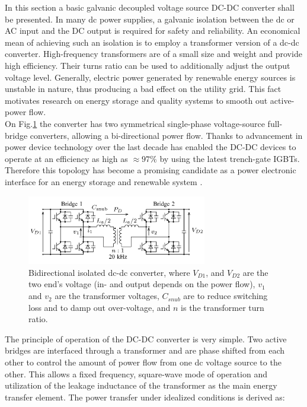 In this section a basic galvanic decoupled voltage source DC-DC converter shall be presented. In many dc power supplies, a galvanic isolation between the dc or AC input and the DC output is required for safety and reliability. An economical mean of achieving such an isolation is to employ a transformer version of a dc-dc converter. High-frequency transformers are of a small size and weight and provide high efficiency. Their turns ratio can be used to additionally adjust the output voltage level. Generally, electric power generated by renewable energy sources is unstable in nature, thus producing a bad effect on the utility grid. This fact motivates research on energy storage and quality systems to smooth out active-power flow.\\
On Fig.\ref{BASICCSR:fig:DCDCGalvanic} the converter has two symmetrical single-phase voltage-source full-bridge converters, allowing a bi-directional power flow. Thanks to advancement in power device technology over the last decade has enabled the DC-DC devices to operate at an efficiency as high as $\approx97\%$ by using the latest trench-gate IGBTs. Therefore this topology has become a promising candidate as a power electronic interface for an energy storage and renewable system \cite{kheraluwala1992performance} \cite{inoue2007bidirectional}.


\begin{figure}[!ht]
        \centering
        \includegraphics[width=0.7\textwidth]{EMPC_PNG_Pics/DC_DC_galvanic.png}
        \caption{Bidirectional isolated dc-dc converter, where $V_{D1}$, and $V_{D2}$ are the two end's voltage (in- and output depends on the power flow), $v_1$ and $v_2$ are the transformer voltages, $C_{snub}$ are to reduce switching loss and to damp out
over-voltage, and $n$ is the transformer turn ratio.}
        \label{BASICCSR:fig:DCDCGalvanic}
    \end{figure}
		
The principle of operation of the DC-DC converter is very simple. Two active bridges are interfaced through a transformer and are phase shifted from each other to control the amount of power flow from one dc voltage source to the other. This allows a fixed frequency, square-wave mode of operation and utilization of the leakage inductance of the transformer as the main energy transfer element. The power transfer under idealized conditions is derived as:

